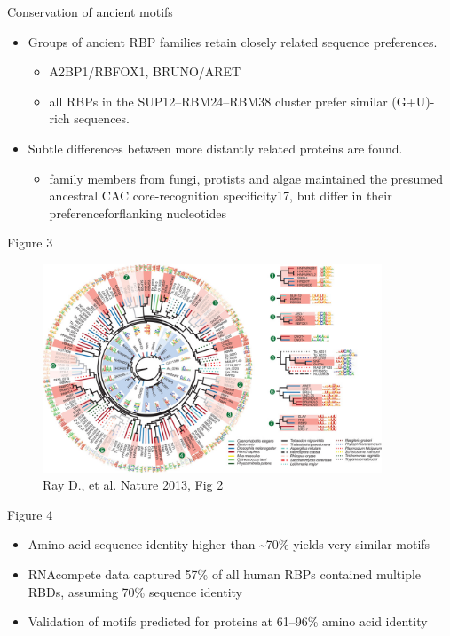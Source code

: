 \documentclass[professionalfont, 12pt, default]{beamer}
\providecommand{\tightlist}{%
    \setlength{\itemsep}{0pt}\setlength{\parskip}{0pt}}
\begin{document}
\begin{frame}{Conservation of ancient motifs}

\begin{itemize}
\tightlist
\item
  Groups of ancient RBP families retain closely related sequence
  preferences.

  \begin{itemize}
  \tightlist
  \item
    A2BP1/RBFOX1, BRUNO/ARET
  \item
    all RBPs in the SUP12--RBM24--RBM38 cluster prefer similar
    (G+U)-rich sequences.
  \end{itemize}
\item
  Subtle differences between more distantly related proteins are found.

  \begin{itemize}
  \tightlist
  \item
    family members from fungi, protists and algae maintained the
    presumed ancestral CAC core-recognition specificity17, but differ in
    their preferenceforflanking nucleotides
  \end{itemize}
\end{itemize}

\end{frame}

\begin{frame}{Figure 3}

\begin{figure}
\centering
\includegraphics[width=0.90000\textwidth]{img/f2.jpg}
\caption{Ray D., et al. Nature 2013, Fig 2}
\end{figure}

\end{frame}

\begin{frame}{Figure 4}

\begin{itemize}
\tightlist
\item
  Amino acid sequence identity higher than \textasciitilde{}70\% yields
  very similar motifs
\item
  RNAcompete data captured 57\% of all human RBPs contained multiple
  RBDs, assuming 70\% sequence identity
\item
  Validation of motifs predicted for proteins at 61--96\% amino acid
  identity
\end{itemize}

\end{frame}
\end{document}
